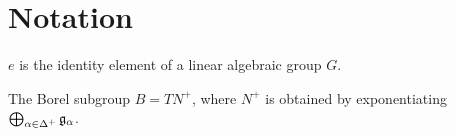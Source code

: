 \chapter{Notation}
$e$ is the identity element of a linear algebraic group $G$.

The Borel subgroup $B = T N^{+}$, where $N^{+}$ is obtained by exponentiating $\bigoplus_{\alpha \in \Delta^+} \mathfrak g_{\alpha}$.